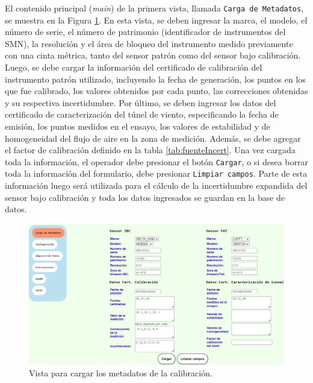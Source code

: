 El contenido principal (\textit{main}) de la primera vista, llamada \texttt{Carga de Metadatos}, se muestra en la Figura \ref{fig:cargaMetadata}. En esta vista, se deben ingresar la marca, el modelo, el número de serie, el número de patrimonio (identificador de instrumentos del SMN), la resolución y el área de bloqueo del instrumento medido previamente con una cinta métrica, tanto del sensor patrón como del sensor bajo calibración. Luego, se debe cargar la información del certificado de calibración del instrumento patrón utilizado, incluyendo la fecha de generación, los puntos en los que fue calibrado, los valores obtenidos por cada punto, las correcciones obtenidas y su respectiva incertidumbre. Por último, se deben ingresar los datos del certificado de caracterización del túnel de viento, especificando la fecha de emisión, los puntos medidos en el ensayo, los valores de estabilidad y de homogeneidad del flujo de aire en la zona de medición. Además, se debe agregar el factor de calibración definido en la tabla \ref{tab:fuenteIncert}. Una vez cargada toda la información, el operador debe presionar el botón \texttt{Cargar}, o si desea borrar toda la información del formulario, debe presionar \texttt{Limpiar campos}. Parte de esta información luego será utilizada para el cálculo de la incertidumbre expandida del sensor bajo calibración y toda los datos ingresados se guardan en la base de datos.

\begin{figure}[H]
    \centering
    \includegraphics[width=1\linewidth]{Figuras/AplicacionWeb/frondend/cargaMetadata.png}
    \caption{Vista para cargar los metadatos de la calibración.}
    \label{fig:cargaMetadata}
\end{figure}

